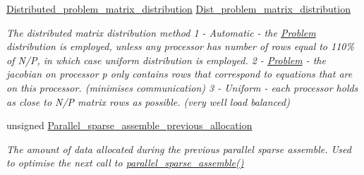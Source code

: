 \begin{DoxyCompactItemize}
\hyperlink{classoomph_1_1Problem_a8fc1f40f2a9309e9ff02772fa2258402}{Distributed\+\_\+problem\+\_\+matrix\+\_\+distribution} \hyperlink{classoomph_1_1Problem_a1da221c501adc7d58bd21f630207c6c3}{Dist\+\_\+problem\+\_\+matrix\+\_\+distribution}
\begin{DoxyCompactList}\small\item\em The distributed matrix distribution method 1 -\/ Automatic -\/ the \hyperlink{classoomph_1_1Problem}{Problem} distribution is employed, unless any processor has number of rows equal to 110\% of N/P, in which case uniform distribution is employed. 2 -\/ \hyperlink{classoomph_1_1Problem}{Problem} -\/ the jacobian on processor p only contains rows that correspond to equations that are on this processor. (minimises communication) 3 -\/ Uniform -\/ each processor holds as close to N/P matrix rows as possible. (very well load balanced) \end{DoxyCompactList}\item 
unsigned \hyperlink{classoomph_1_1Problem_a6a96b64a44cb378db1c0a07c562f7dae}{Parallel\+\_\+sparse\+\_\+assemble\+\_\+previous\+\_\+allocation}
\begin{DoxyCompactList}\small\item\em The amount of data allocated during the previous parallel sparse assemble. Used to optimise the next call to \hyperlink{classoomph_1_1Problem_a0487a7ef40e6cc4dad88e99ac96193e2}{parallel\+\_\+sparse\+\_\+assemble()} \end{DoxyCompactList}\end{DoxyCompactItemize}
